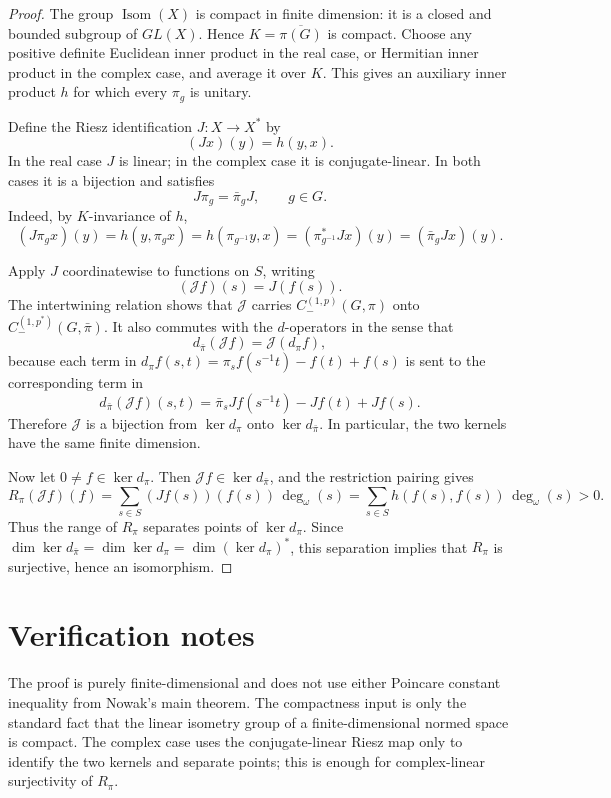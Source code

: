 \documentclass[11pt]{article}
\newcommand{\Isom}{\operatorname{Isom}}
\begin{document}
\begin{proof}
The group \(\Isom(X)\) is compact in finite dimension: it is a closed and
bounded subgroup of \(GL(X)\). Hence \(K=\overline{\pi(G)}\) is compact. Choose
any positive definite Euclidean inner product in the real case, or Hermitian
inner product in the complex case, and average it over \(K\). This gives an
auxiliary inner product \(h\) for which every \(\pi_g\) is unitary.

Define the Riesz identification \(J:X\to X^*\) by
\[
   (Jx)(y)=h(y,x).
\]
In the real case \(J\) is linear; in the complex case it is conjugate-linear.
In both cases it is a bijection and satisfies
\[
   J\pi_g=\bar\pi_gJ,\qquad g\in G.
\]
Indeed, by \(K\)-invariance of \(h\),
\[
   (J\pi_gx)(y)=h(y,\pi_gx)=h(\pi_{g^{-1}}y,x)
      =(\pi_{g^{-1}}^*Jx)(y)=(\bar\pi_gJx)(y).
\]

Apply \(J\) coordinatewise to functions on \(S\), writing
\[
   (\mathcal J f)(s)=J(f(s)).
\]
The intertwining relation shows that \(\mathcal J\) carries
\(C_-^{(1,p)}(G,\pi)\) onto \(C_-^{(1,p^*)}(G,\bar\pi)\). It also commutes
with the \(d\)-operators in the sense that
\[
   d_{\bar\pi}(\mathcal J f)=\mathcal J(d_\pi f),
\]
because each term in \(d_\pi f(s,t)=\pi_s f(s^{-1}t)-f(t)+f(s)\) is sent to
the corresponding term in
\[
   d_{\bar\pi}(\mathcal J f)(s,t)
   =\bar\pi_sJf(s^{-1}t)-Jf(t)+Jf(s).
\]
Therefore \(\mathcal J\) is a bijection from \(\ker d_\pi\) onto
\(\ker d_{\bar\pi}\). In particular, the two kernels have the same finite
dimension.

Now let \(0\ne f\in\ker d_\pi\). Then \(\mathcal J f\in\ker d_{\bar\pi}\), and
the restriction pairing gives
\[
   R_\pi(\mathcal J f)(f)
   =\sum_{s\in S}(Jf(s))(f(s))\,\deg_\omega(s)
   =\sum_{s\in S}h(f(s),f(s))\,\deg_\omega(s)>0.
\]
Thus the range of \(R_\pi\) separates points of \(\ker d_\pi\). Since
\(\dim \ker d_{\bar\pi}=\dim\ker d_\pi=\dim(\ker d_\pi)^*\), this separation
implies that \(R_\pi\) is surjective, hence an isomorphism.
\end{proof}

\section*{Verification notes}

The proof is purely finite-dimensional and does not use either Poincare
constant inequality from Nowak's main theorem. The compactness input is only the
standard fact that the linear isometry group of a finite-dimensional normed
space is compact. The complex case uses the conjugate-linear Riesz map only to
identify the two kernels and separate points; this is enough for complex-linear
surjectivity of \(R_\pi\).
\end{document}
